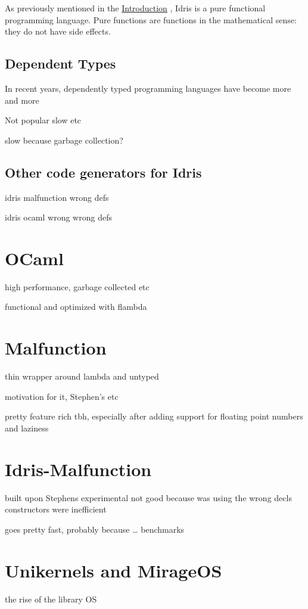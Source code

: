 As previously mentioned in the \hyperref[ch:intro]{Introduction}
, Idris is a pure functional programming language.
Pure functions are functions in the mathematical sense: they
do not have side effects.


\subsection{Dependent Types}

In recent years, dependently typed programming languages
have become more and more \citep{brady_2013}

Not popular slow etc

slow because garbage collection?


\subsection{Other code generators for Idris}
idris malfunction  wrong defs

idris ocaml wrong  wrong defs

\section{OCaml}
high performance, garbage collected etc

functional and optimized with flambda

\section{Malfunction}
thin wrapper around lambda and untyped

motivation for it, Stephen's etc

pretty feature rich tbh, especially after adding support
for floating point numbers and laziness


\section{Idris-Malfunction}
built upon Stephens experimental
not good because was using the wrong decls
constructors were inefficient

goes pretty fast, probably because \ldots
benchmarks

\section{Unikernels and MirageOS}
the rise of the library OS